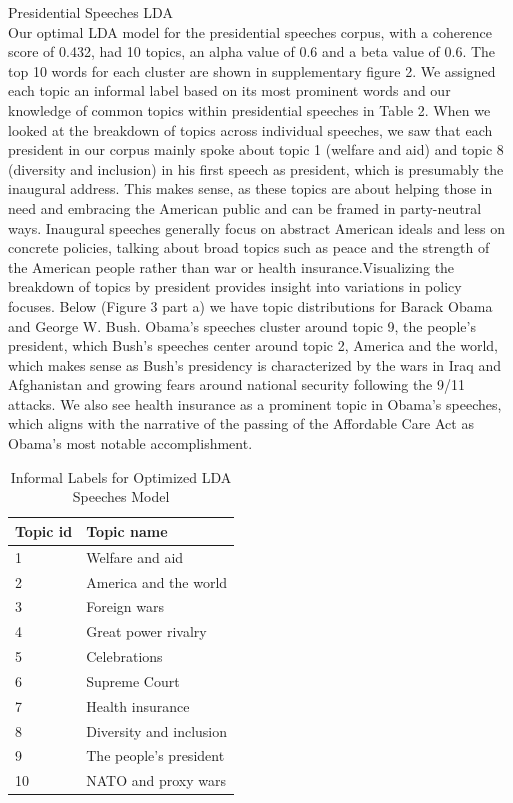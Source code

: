 \documentclass{article}
\begin{document}
{{Presidential Speeches LDA \\
Our optimal LDA model for the presidential speeches corpus, with a coherence score of 0.432, had 10 topics, an alpha value of 0.6 and a beta value of 0.6. The top 10 words for each cluster are shown in supplementary figure 2. 
We assigned each topic an informal label based on its most prominent words and our knowledge of common topics within presidential speeches in Table 2.
When we looked at the breakdown of topics across individual speeches, we saw that each president in our corpus mainly spoke about topic 1 (welfare and aid) and topic 8 (diversity and inclusion) in his first speech as president, which is presumably the inaugural address. This makes sense, as these topics are about helping those in need and embracing the American public and can be framed in party-neutral ways. Inaugural speeches generally focus on abstract American ideals and less on concrete policies, talking about broad topics such as peace and the strength of the American people rather than war or health insurance.Visualizing the breakdown of topics by president provides insight into variations in policy focuses. Below (Figure 3 part a) we have topic distributions for Barack Obama and George W. Bush. Obama’s speeches cluster around topic 9, the people’s president, which Bush’s speeches center around topic 2, America and the world, which makes sense as Bush’s presidency is characterized by the wars in Iraq and Afghanistan and growing fears around national security following the 9/11 attacks. We also see health insurance as a prominent topic in Obama’s speeches, which aligns with the narrative of the passing of the Affordable Care Act as Obama’s most notable accomplishment.  

\begin{table}[H]
	\caption{Informal Labels for Optimized LDA Speeches Model}
	\centering
	\begin{tabular}{ll}
		\toprule
		\midrule
		Topic id  & Topic name \\
		\midrule
		\midrule
		1 & Welfare and aid \\
		\midrule
		2 & America and the world \\
		\midrule
		3 & Foreign wars \\
		\midrule
		4 & Great power rivalry \\
		\midrule
		5 & Celebrations \\
		\midrule
		6 & Supreme Court \\
		\midrule
		7 & Health insurance \\
		\midrule
		8 & Diversity and inclusion \\
		\midrule
		9 & The people’s president \\
		\midrule
		10 & NATO and proxy wars \\
		\bottomrule
	\end{tabular}
\end{table}

}}
\end{document}

